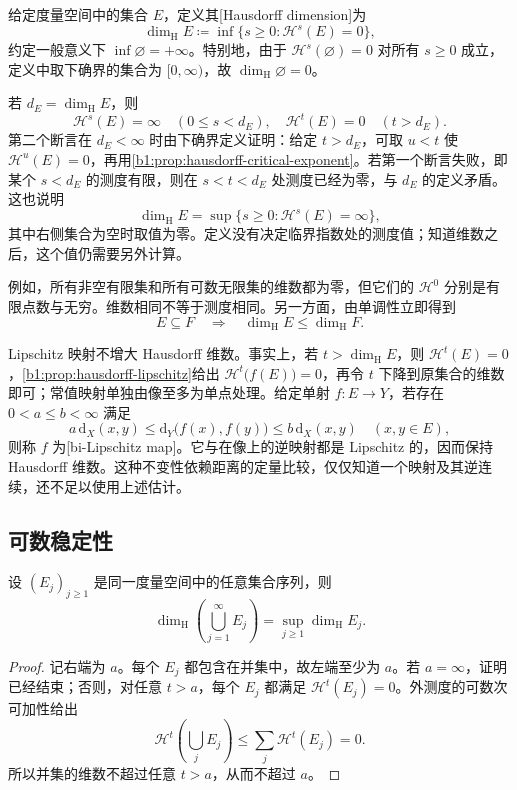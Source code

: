 \begin{definition}
\label{b1:def:hausdorff-dimension}
给定度量空间中的集合 \(E\)，定义其[Hausdorff dimension]为
\[
\dim_{\mathrm H}E
\coloneqq\inf\{s\geq0:\mathcal H^s(E)=0\},
\]
约定一般意义下 \(\inf\varnothing=+\infty\)。特别地，由于
\(\mathcal H^s(\varnothing)=0\) 对所有 \(s\geq0\) 成立，定义中取下确界的集合为
\([0,\infty)\)，故 \(\dim_{\mathrm H}\varnothing=0\)。
\end{definition}

若 \(d_E=\dim_{\mathrm H}E\)，则
\[
\mathcal H^s(E)=\infty\quad(0\leq s<d_E),
\quad
\mathcal H^t(E)=0\quad(t>d_E).
\]
第二个断言在 \(d_E<\infty\) 时由下确界定义证明：给定 \(t>d_E\)，可取 \(u<t\) 使 \(\mathcal H^u(E)=0\)，再用\cref{b1:prop:hausdorff-critical-exponent}。若第一个断言失败，即某个 \(s<d_E\) 的测度有限，则在 \(s<t<d_E\) 处测度已经为零，与 \(d_E\) 的定义矛盾。这也说明
\[
\dim_{\mathrm H}E
=\sup\{s\geq0:\mathcal H^s(E)=\infty\},
\]
其中右侧集合为空时取值为零。定义没有决定临界指数处的测度值；知道维数之后，这个值仍需要另外计算。

\ProseParagraphBreak

例如，所有非空有限集和所有可数无限集的维数都为零，但它们的 \(\mathcal H^0\) 分别是有限点数与无穷。维数相同不等于测度相同。另一方面，由单调性立即得到
\[
E\subseteq F\quad\Longrightarrow\quad
\dim_{\mathrm H}E\leq\dim_{\mathrm H}F.
\]

Lipschitz 映射不增大 Hausdorff 维数。事实上，若 \(t>\dim_{\mathrm H}E\)，则 \(\mathcal H^t(E)=0\)，\cref{b1:prop:hausdorff-lipschitz}给出 \(\mathcal H^t\bigl(f(E)\bigr)=0\)，再令 \(t\) 下降到原集合的维数即可；常值映射单独由像至多为单点处理。给定单射 \(f:E\to Y\)，若存在 \(0<a\leq b<\infty\) 满足
\[
a\,\mathrm{d}_X(x,y)\leq \mathrm{d}_Y\bigl(f(x),f(y)\bigr)
\leq b\,\mathrm{d}_X(x,y)
\quad(x,y\in E),
\]
则称 \(f\) 为[bi-Lipschitz map]。它与在像上的逆映射都是 Lipschitz 的，因而保持 Hausdorff 维数。这种不变性依赖距离的定量比较，仅仅知道一个映射及其逆连续，还不足以使用上述估计。

\subsection{可数稳定性}
\label{b1:subsec:150203}

\begin{proposition}
\label{b1:prop:hausdorff-dimension-countable}
设 \((E_j)_{j\geq1}\) 是同一度量空间中的任意集合序列，则
\[
\dim_{\mathrm H}\left(\bigcup_{j=1}^{\infty}E_j\right)
=\sup_{j\geq1}\dim_{\mathrm H}E_j.
\]
\end{proposition}
\begin{proof}
记右端为 \(a\)。每个 \(E_j\) 都包含在并集中，故左端至少为 \(a\)。若 \(a=\infty\)，证明已经结束；否则，对任意 \(t>a\)，每个 \(E_j\) 都满足 \(\mathcal H^t(E_j)=0\)。外测度的可数次可加性给出
\[
\mathcal H^t\left(\bigcup_jE_j\right)
\leq\sum_j\mathcal H^t(E_j)=0.
\]
所以并集的维数不超过任意 \(t>a\)，从而不超过 \(a\)。
\end{proof}

